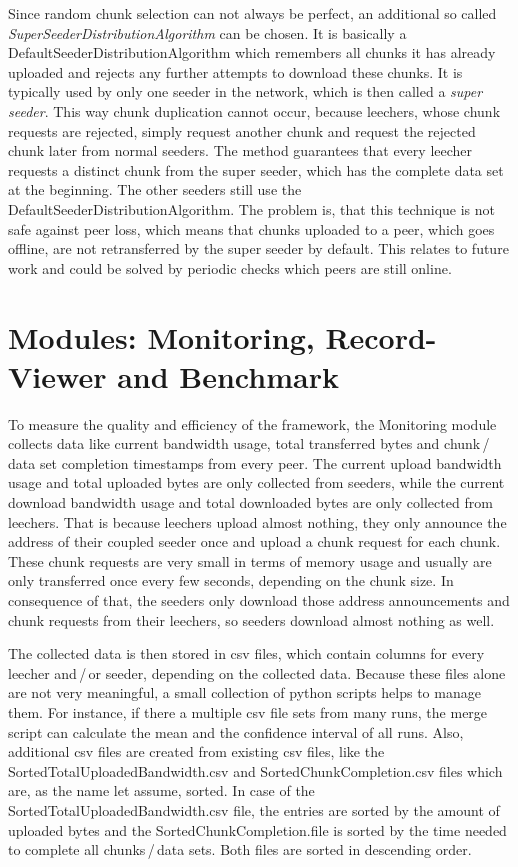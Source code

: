 Since random chunk selection can not always be perfect, an additional so called \emph{SuperSeederDistributionAlgorithm} can be chosen. It is basically a DefaultSeederDistributionAlgorithm which remembers all chunks it has already uploaded and rejects any further attempts to download these chunks. It is typically used by only one seeder in the network, which is then called a \emph{super seeder}. This way chunk duplication cannot occur, because leechers, whose chunk requests are rejected, simply request another chunk and request the rejected chunk later from normal seeders. The method guarantees that every leecher requests a distinct chunk from the super seeder, which has the complete data set at the beginning. The other seeders still use the DefaultSeederDistributionAlgorithm. The problem is, that this technique is not safe against peer loss, which means that chunks uploaded to a peer, which goes offline, are not retransferred by the super seeder by default. This relates to future work and could be solved by periodic checks which peers are still online.

\cleardoublepage
\chapter{Modules: Monitoring, Record-Viewer and Benchmark}
\label{ch:monitoring}

To measure the quality and efficiency of the framework, the Monitoring module collects data like current bandwidth usage, total transferred bytes and chunk\,/\,data set completion timestamps from every peer. The current upload bandwidth usage and total uploaded bytes are only collected from seeders, while the current download bandwidth usage and total downloaded bytes are only collected from leechers. That is because leechers upload almost nothing, they only announce the address of their coupled seeder once and upload a chunk request for each chunk. These chunk requests are very small in terms of memory usage and usually are only transferred once every few seconds, depending on the chunk size. In consequence of that, the seeders only download those address announcements and chunk requests from their leechers, so seeders download almost nothing as well.

The collected data is then stored in csv files, which contain columns for every leecher and\,/\,or seeder, depending on the collected data. Because these files alone are not very meaningful, a small collection of python scripts helps to manage them. For instance, if there a multiple csv file sets from many runs, the merge script can calculate the mean and the confidence interval of all runs. Also, additional csv files are created from existing csv files, like the SortedTotalUploadedBandwidth.csv and SortedChunkCompletion.csv files which are, as the name let assume, sorted. In case of the SortedTotalUploadedBandwidth.csv file, the entries are sorted by the amount of uploaded bytes and the SortedChunkCompletion.file is sorted by the time needed to complete all chunks\,/\,data sets. Both files are sorted in descending order.

